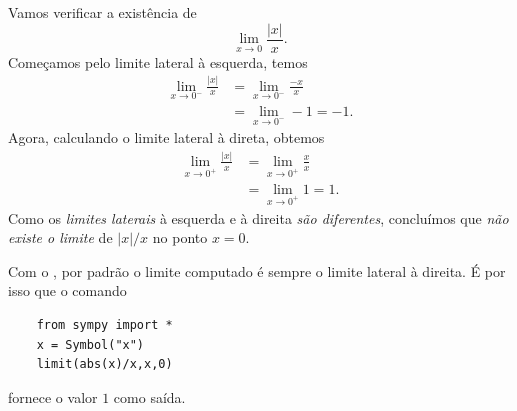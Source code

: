 \begin{exer}
  Vamos verificar a existência de
  \begin{equation}
    \lim_{x\to 0} \frac{|x|}{x}.
  \end{equation}
  Começamos pelo limite lateral à esquerda, temos
  \begin{align}
    \lim_{x\to 0^-} \frac{|x|}{x} &= \lim_{x\to 0^-} \frac{-x}{x}\\
    &= \lim_{x\to 0^-} -1 = -1.
  \end{align}
  Agora, calculando o limite lateral à direta, obtemos
  \begin{align}
    \lim_{x\to 0^+} \frac{|x|}{x} &= \lim_{x\to 0^+} \frac{x}{x}\\
    &= \lim_{x\to 0^+} 1 = 1.
  \end{align}
  Como os \emph{limites laterais} à esquerda e à direita \emph{são diferentes}, concluímos que \emph{não existe o limite} de $|x|/x$ no ponto $x=0$.

  \ifispython
  Com o {\sympy}, por padrão o limite computado é sempre o limite lateral à direita. É por isso que o comando
  \begin{lstlisting}
    from sympy import *
    x = Symbol("x")
    limit(abs(x)/x,x,0)
  \end{lstlisting}
  fornece o valor $1$ como saída.
  \fi
\end{exer}

